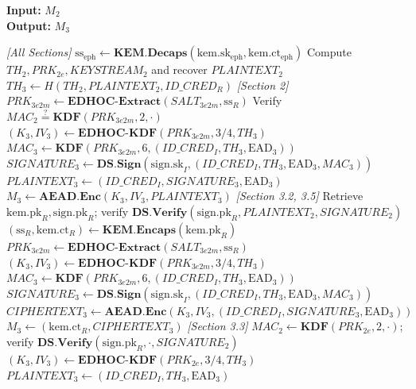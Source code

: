 \documentclass{easychair}
\begin{document}
\begin{algorithm}[H]
\caption{Step 3 (\emph{Initiator}) --- Memproses $M_2$ dan menyiapkan $M_3$}
\label{alg:step3}
\textbf{Input:} $M_2$ \\
\textbf{Output:} $M_3$
\begin{algorithmic}[1]
\Statex \textit{[All Sections]}
\State $\mathrm{ss}_{\mathrm{eph}} \gets \mathbf{KEM.Decaps}(\mathrm{kem.sk}_{\mathrm{eph}}, \mathrm{kem.ct}_{\mathrm{eph}})$
\State Compute $TH_2, PRK_{2e}, KEYSTREAM_2$ and recover $PLAINTEXT_2$
\State $TH_3 \gets H(TH_2, PLAINTEXT_2, ID\_CRED_R)$
\Statex \textit{[Section 2]} 
\State $PRK_{3e2m} \gets \mathbf{EDHOC\text{-}Extract}(SALT_{3e2m}, \mathrm{ss}_R)$
\State Verify $MAC_2 \stackrel{?}{=} \mathbf{KDF}(PRK_{3e2m}, 2, \cdot)$
\State $(K_3, IV_3) \gets \mathbf{EDHOC\text{-}KDF}(PRK_{3e2m}, 3\text{/}4, TH_3)$
\State $MAC_3 \gets \mathbf{KDF}(PRK_{3e2m}, 6, (ID\_CRED_I, TH_3, \mathrm{EAD}_3))$
\State $SIGNATURE_3 \gets \mathbf{DS.Sign}(\mathrm{sign.sk}_I, (ID\_CRED_I, TH_3, \mathrm{EAD}_3, MAC_3))$
\State $PLAINTEXT_3 \gets (ID\_CRED_I, SIGNATURE_3, \mathrm{EAD}_3)$
\State $M_3 \gets \mathbf{AEAD.Enc}(K_3, IV_3, PLAINTEXT_3)$
\Statex \textit{[Section 3.2, 3.5]} 
\State Retrieve $\mathrm{kem.pk}_R, \mathrm{sign.pk}_R$; verify $\mathbf{DS.Verify}(\mathrm{sign.pk}_R, PLAINTEXT_2, SIGNATURE_2)$
\State $(\mathrm{ss}_R, \mathrm{kem.ct}_R) \gets \mathbf{KEM.Encaps}(\mathrm{kem.pk}_R)$
\State $PRK_{3e2m} \gets \mathbf{EDHOC\text{-}Extract}(SALT_{3e2m}, \mathrm{ss}_R)$
\State $(K_3, IV_3) \gets \mathbf{EDHOC\text{-}KDF}(PRK_{3e2m}, 3\text{/}4, TH_3)$
\State $MAC_3 \gets \mathbf{KDF}(PRK_{3e2m}, 6, (ID\_CRED_I, TH_3, \mathrm{EAD}_3))$
\State $SIGNATURE_3 \gets \mathbf{DS.Sign}(\mathrm{sign.sk}_I, (ID\_CRED_I, TH_3, \mathrm{EAD}_3, MAC_3))$
\State $CIPHERTEXT_3 \gets \mathbf{AEAD.Enc}(K_3, IV_3, (ID\_CRED_I, SIGNATURE_3, \mathrm{EAD}_3))$
\State $M_3 \gets (\mathrm{kem.ct}_R, CIPHERTEXT_3)$
\Statex \textit{[Section 3.3]} 
\State $MAC_2 \gets \mathbf{KDF}(PRK_{2e}, 2, \cdot)$; verify $\mathbf{DS.Verify}(\mathrm{sign.pk}_R, \cdot, SIGNATURE_2)$
\State $(K_3, IV_3) \gets \mathbf{EDHOC\text{-}KDF}(PRK_{2e}, 3\text{/}4, TH_3)$
\State $PLAINTEXT_3 \gets (ID\_CRED_I, TH_3, \mathrm{EAD}_3)$

\end{algorithmic}
\end{algorithm}
\end{document}
